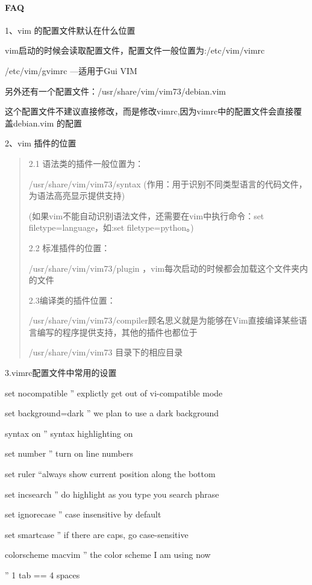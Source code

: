 \documentclass[letterpaper,10pt]{sphinxmanual}
\begin{document}
\paragraph{FAQ}
\label{Linux_vim/install:faq}
1、vim 的配置文件默认在什么位置

vim启动的时候会读取配置文件，配置文件一般位置为:/etc/vim/vimrc

/etc/vim/gvimrc   ---适用于Gui VIM

另外还有一个配置文件：/usr/share/vim/vim73/debian.vim

这个配置文件不建议直接修改，而是修改vimrc,因为vimrc中的配置文件会直接覆盖debian.vim 的配置

2、vim 插件的位置
\begin{quote}

2.1 语法类的插件一般位置为：

/usr/share/vim/vim73/syntax (作用：用于识别不同类型语言的代码文件，为语法高亮显示提供支持)

(如果vim不能自动识别语法文件，还需要在vim中执行命令：set filetype=language，如:set filetype=python。)

2.2 标准插件的位置：

/usr/share/vim/vim73/plugin ，vim每次启动的时候都会加载这个文件夹内的文件

2.3编译类的插件位置：

/usr/share/vim/vim73/compiler顾名思义就是为能够在Vim直接编译某些语言编写的程序提供支持，其他的插件也都位于

/usr/share/vim/vim73 目录下的相应目录
\end{quote}

3.vimrc配置文件中常用的设置

set nocompatible '' explictly get out of vi-compatible mode

set background=dark '' we plan to use a dark background

syntax on  '' syntax highlighting on

set number  '' turn on line numbers

set ruler  ``always show current position along the bottom

set incsearch  '' do highlight as you type you search phrase

set ignorecase  '' case insensitive by default

set smartcase  '' if there are caps, go case-sensitive

colorscheme macvim '' the color scheme I am using now

'' 1 tab == 4 spaces
\end{document}
